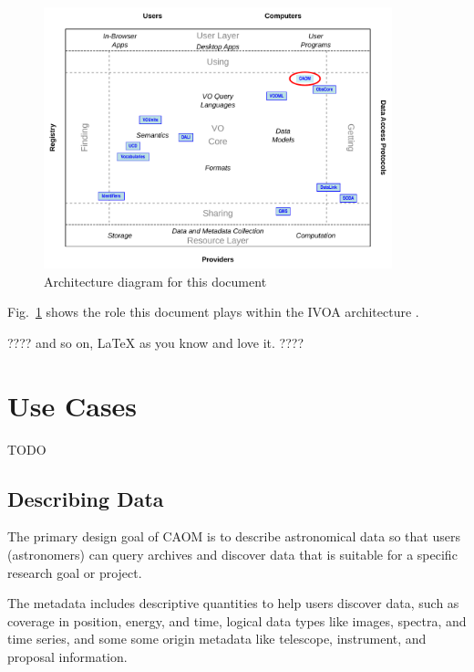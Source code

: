 \documentclass[11pt,a4paper]{ivoa}
\begin{document}
\begin{figure}
\centering


\includegraphics[width=0.9\textwidth]{role_diagram.pdf}
\caption{Architecture diagram for this document}
\label{fig:archdiag}
\end{figure}

Fig.~\ref{fig:archdiag} shows the role this document plays within the
IVOA architecture \citep{2021ivoa.spec.1101D}.

???? and so on, LaTeX as you know and love it. ????

\section{Use Cases}

TODO

\subsection{Describing Data}

The primary design goal of CAOM is to describe astronomical data so that 
users (astronomers) can query archives and discover data that is suitable
for a specific research goal or project. 

The metadata includes descriptive quantities to help users discover data, 
such as coverage in position, energy, and time, logical data types like 
images, spectra, and time series, and some some origin metadata like 
telescope, instrument, and proposal information.
\end{document}
